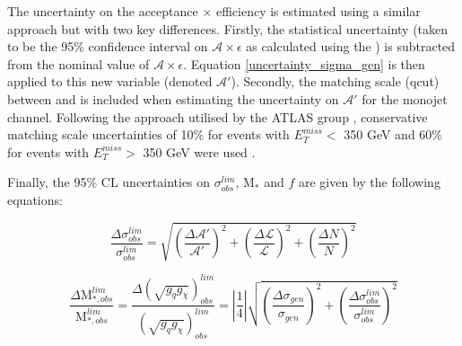 \begin{flushleft}
\bigskip

The uncertainty on the acceptance $\times$ efficiency is estimated using a similar approach but with two key differences. Firstly, the statistical uncertainty (taken to be the 95\% confidence interval on $\mathcal{A}\times\epsilon$ as calculated using the ) is subtracted from the nominal value of $\mathcal{A}\times\epsilon$. Equation \ref{uncertainty_sigma_gen} is then applied to this new variable (denoted $\mathcal{A}'$). Secondly, the matching scale (qcut) between \MG and \PYTHIA is included when estimating the uncertainty on $\mathcal{A}'$ for the monojet channel. Following the approach utilised by the ATLAS group \cite{CERN-THESIS-2015-038}, conservative matching scale uncertainties of 10\% for events with $E_{T}^{miss} <$ 350 GeV and 60\% for events with $E_{T}^{miss} >$ 350 GeV were used .
 
\bigskip

Finally, the 95\% CL uncertainties on $\sigma_{obs}^{lim}$, M$_{*}$ and $f$ are given by the following equations:

\begin{equation}
\label{uncertainty_sigma_lim}
\frac{\Delta \sigma_{obs}^{lim}}{\sigma_{obs}^{lim}} = \sqrt{\left(\frac{\Delta \mathcal{A}'}{\mathcal{A}'}\right)^{2} + \left(\frac{\Delta \mathcal{L}}{\mathcal{L}}\right)^{2} + \left(\frac{\Delta N}{N}\right)^{2}}
\end{equation}

\begin{equation}
\label{uncertainty_M_star}
\frac{\Delta \mbox{M}_{*,obs}^{lim}}{\mbox{M}_{*,obs}^{lim}} = \frac{\Delta (\sqrt{g_{q}g_{\chi}})_{obs}^{lim}}{(\sqrt{g_{q}g_{\chi}})_{obs}^{lim}} = \left|\frac{1}{4}\right|\sqrt{\left(\frac{\Delta \sigma_{gen}}{\sigma_{gen}}\right)^{2} + \left(\frac{\Delta \sigma_{obs}^{lim}}{\sigma_{obs}^{lim}}\right)^{2}}
\end{equation}

\end{flushleft}